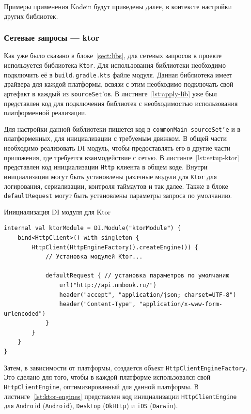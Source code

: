 \documentclass[14pt, russian]{scrartcl}
\begin{document}
Примеры применения Kodein будут приведены далее, в контексте настройки других библиотек.

\subsubsection{Сетевые запросы --- ktor}\label{sect:ktor}

Как уже было сказано в блоке~\ref{sect:libs}, для сетевых запросов в проекте используется библиотека \texttt{Ktor}. Для использования библиотеки необходимо подключить её в \texttt{build.gradle.kts} файле модуля. Данная библиотека имеет драйвера для каждой платформы, всвязи с этим необходимо подключать свой артефакт в каждый из \texttt{sourceSet}'ов. В листинге~\ref{lst:apply-lib} уже был представлен код для подключения библиотек с необходимостью использования платформенной реализации.

Для настройки данной библиотеки пишется код в \texttt{commonMain sourceSet'e} и в платформенных, для инициализации с требуемым движком. В общей части необходимо реализовать DI модуль, чтобы предоставлять его в другие части приложения, где требуется взаимодействие с сетью. В листинге~\ref{lst:setup-ktor} представлен код инициализации \texttt{Http} клиента в общем коде. Внутри инициализации могут быть установлены разлчные модули для \texttt{Ktor} для логирования, сериализации, контроля таймаутов и так далее. Также в блоке \texttt{defaultRequest} могут быть установлены параметры запроса по умолчанию.

\begin{listing}[!htb]
\caption{Инициализация DI модуля для Ktor}
\label{lst:setup-ktor}
\begin{verbatim}
internal val ktorModule = DI.Module("ktorModule") {
    bind<HttpClient>() with singleton {
        HttpClient(HttpEngineFactory().createEngine()) {
            // Установка модулей Ktor...

            defaultRequest { // установка параметров по умолчанию
                url("http://api.nmbook.ru/")
                header("accept", "application/json; charset=UTF-8")
                header("Content-Type", "application/x-www-form-urlencoded")
            }
        }
    }
}
\end{verbatim}
\end{listing}

Затем, в зависимости от платформы, создается объект \texttt{HttpClientEngineFactory}. Это сделано для того, чтобы в каждой платформе использовался свой \texttt{HttpClientEngine}, оптимизированный для данной платформы. В листинге~\ref{lst:ktor-engines} представлен код инициализации \texttt{HttpClientEngine} для \texttt{Android} (\texttt{Android}), \texttt{Desktop} (\texttt{OkHttp}) и \texttt{iOS} (\texttt{Darwin}).
\end{document}
